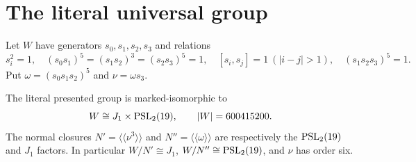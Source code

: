 \section{The literal universal group}
Let $W$ have generators $s_0,s_1,s_2,s_3$ and relations
\begin{equation}\label{W}
 s_i^2=1,\quad(s_0s_1)^5=(s_1s_2)^3=(s_2s_3)^5=1,
 \quad[s_i,s_j]=1\ (|i-j|>1),\quad(s_1s_2s_3)^5=1.
\end{equation}
Put $\omega=(s_0s_1s_2)^5$ and $\nu=\omega s_3$.
\begin{theorem}\label{structure}
The literal presented group is marked-isomorphic to
\[
 W\cong J_1\times\operatorname{PSL}_2(19),\qquad |W|=600415200.
\]
The normal closures $N'=\langle\!\langle\nu^3\rangle\!\rangle$ and $N''=\langle\!\langle\omega\rangle\!\rangle$ are respectively the $\operatorname{PSL}_2(19)$ and $J_1$ factors. In particular $W/N'\cong J_1$, $W/N''\cong\operatorname{PSL}_2(19)$, and $\nu$ has order six.
\end{theorem}
